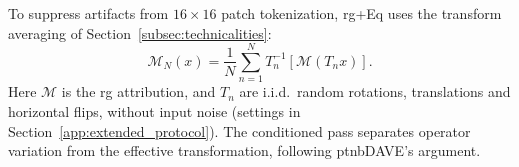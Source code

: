To suppress artifacts from $16{\times}16$ patch tokenization, \ac{rg}+Eq uses the transform averaging of Section~\ref{subsec:technicalities}:
\begin{equation}\label{ptnb:eq:equivariant-average}
    \mathcal M_N(x)=\frac1N\sum_{n=1}^N T_n^{-1}[\mathcal M(T_nx)].
\end{equation}
Here $\mathcal M$ is the \ac{rg} attribution, and $T_n$ are i.i.d.\ random rotations, translations and horizontal flips, without input noise (settings in Section~\ref{app:extended_protocol}). The conditioned pass separates operator variation from the effective transformation, following \ac{ptnbDAVE}'s argument.
